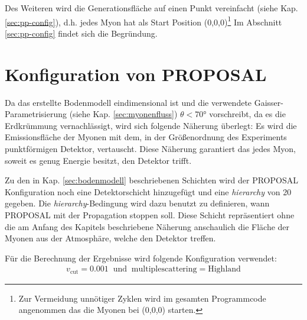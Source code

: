Des Weiteren wird die Generationsfläche auf einen Punkt vereinfacht (siehe Kap. \ref{sec:pp-config}),
d.h. jedes Myon hat als Start Position
(0,0,0)\footnote{
    Zur Vermeidung unnötiger Zyklen wird im gesamten Programmcode
    angenommen das die Myonen bei (0,0,0) starten.}
Im Abschnitt \ref{sec:pp-config}
findet sich die Begründung.


\section{Konfiguration von PROPOSAL}

Da das erstellte Bodenmodell eindimensional ist und die verwendete Gaisser-Parametrisierung
(siehe Kap. \ref{sec:myonenfluss}) $\theta < 70°$ vorschreibt, da es die Erdkrümmung
vernachlässigt, wird sich folgende Näherung überlegt:
Es wird die Emissionsfläche der Myonen mit dem, in der Größenordnung des Experiments 
punktförmigen Detektor, vertauscht.
Diese Näherung garantiert das jedes Myon, soweit es genug Energie besitzt, den Detektor trifft.

Zu den in Kap. \ref{sec:bodenmodell} beschriebenen Schichten wird der PROPOSAL 
Konfiguration noch eine Detektorschicht hinzugefügt und eine \textit{hierarchy}
von 20 gegeben. Die \textit{hierarchy}-Bedingung wird dazu benutzt zu definieren, 
wann PROPOSAL mit der Propagation stoppen soll.
Diese Schicht repräsentiert ohne die am 
Anfang des Kapitels beschriebene Näherung anschaulich die Fläche der Myonen aus der Atmosphäre,
welche den Detektor treffen. 



Für die Berechnung der Ergebnisse wird folgende Konfiguration verwendet:
\begin{align}
    v_\mathrm{cut} = 0.001  \;\; \mathrm{und} \;\; \mathrm{multiplescattering} = \mathrm{Highland}
\end{align}

